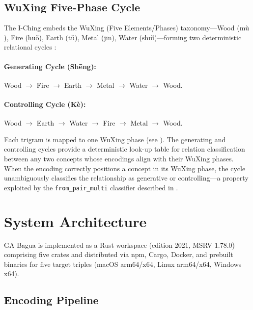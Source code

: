 \documentclass[11pt,a4paper]{article}
\newcommand{\trigram}[1]{\text{#1}}
\begin{document}
\subsection{WuXing Five-Phase Cycle}

The I-Ching embeds the WuXing (Five Elements/Phases) taxonomy---Wood
($\trigram{m\`{u}}$), Fire ($\trigram{hu\v{o}}$), Earth
($\trigram{t\v{u}}$), Metal ($\trigram{j\={i}n}$), Water
($\trigram{shu\v{i}}$)---forming two deterministic relational cycles
\cite{needham1956wuxing}:

\paragraph{Generating Cycle (Sh\={e}ng):}
Wood $\to$ Fire $\to$ Earth $\to$ Metal $\to$ Water $\to$ Wood.

\paragraph{Controlling Cycle (K\`{e}):}
Wood $\to$ Earth $\to$ Water $\to$ Fire $\to$ Metal $\to$ Wood.

Each trigram is mapped to one WuXing phase (see ). The
generating and controlling cycles provide a deterministic look-up table for
relation classification between any two concepts whose encodings align with
their WuXing phases. When the encoding correctly positions a concept in its
WuXing phase, the cycle unambiguously classifies the relationship as
generative or controlling---a property exploited by the
\texttt{from\_pair\_multi} classifier described in .

\section{System Architecture}
\label{sec:architecture}

GA-Bagua is implemented as a Rust workspace (edition 2021, MSRV 1.78.0)
comprising five crates and distributed via npm, Cargo, Docker, and prebuilt
binaries for five target triples (macOS arm64/x64, Linux arm64/x64, Windows x64).

\subsection{Encoding Pipeline}
\end{document}
